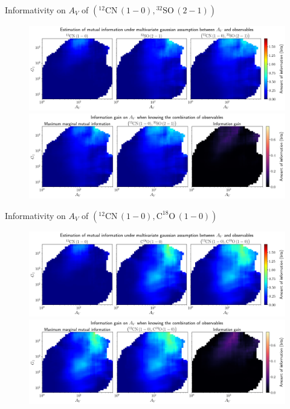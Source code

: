 \documentclass{beamer}
\begin{document}
\begin{frame}{Informativity on $A_V$ of $\left(\mathrm{^{12}CN\,(1-0)},\mathrm{^{32}SO\,(2-1)}\right)$}
    \begin{figure}
        \centering
        \includegraphics[width=0.95\linewidth]{../linearinfogauss/av__12cn10_32so21_linearinfogauss.png}
        \vfill
        \includegraphics[width=0.95\linewidth]{../linearinfogauss/av__12cn10_32so21_linearinfogauss_gain.png}
    \end{figure}
\end{frame}

\begin{frame}{Informativity on $A_V$ of $\left(\mathrm{^{12}CN\,(1-0)},\mathrm{C^{18}O\,(1-0)}\right)$}
    \begin{figure}
        \centering
        \includegraphics[width=0.95\linewidth]{../linearinfogauss/av__12cn10_c18o10_linearinfogauss.png}
        \vfill
        \includegraphics[width=0.95\linewidth]{../linearinfogauss/av__12cn10_c18o10_linearinfogauss_gain.png}
    \end{figure}
\end{frame}
\end{document}

